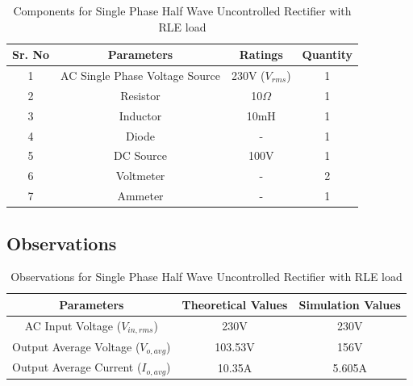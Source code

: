\begin{table}[h]
    \renewcommand{\arraystretch}{1.3}
    \label{table_components_required_single-phase-half-wave-uncontrolled-rectifier-with-RLE-load}
    \centering
    \begin{tabular}{|c|c|c|c|}
        \hline
        Sr. No & Parameters                     & Ratings            & Quantity \\
        \hline
        \hline
        1      & AC Single Phase Voltage Source & 230V ($ V_{rms} $) & 1        \\
        \hline
        2      & Resistor                       & 10$ \Omega $       & 1        \\
        \hline
        3      & Inductor                       & 10mH               & 1        \\
        \hline
        4      & Diode                          & -                  & 1        \\
        \hline
        5      & DC Source                      & 100V               & 1        \\
        \hline
        6      & Voltmeter                      & -                  & 2        \\
        \hline
        7      & Ammeter                        & -                  & 1        \\
        \hline
    \end{tabular}
    \caption{Components for Single Phase Half Wave Uncontrolled Rectifier with RLE load}
\end{table}




\subsection{Observations}

\begin{table}[h]
    \renewcommand{\arraystretch}{1.3}

    \label{table_observation_single-phase-half-wave-uncontrolled-rectifier-with-RLE-load}
    \centering
    \begin{tabular}{|c|c|c|}
        \hline
        Parameters                              & Theoretical Values & Simulation Values \\
        \hline
        \hline
        AC Input Voltage ($ V_{in,rms} $)       & 230V               & 230V              \\
        \hline
        Output Average Voltage ($ V_{o,avg} $)  & 103.53V            & 156V              \\
        \hline
        Output Average Current ($ I_{o,avg}  $) & 10.35A             & 5.605A            \\
        \hline
    \end{tabular}
    \caption{Observations for Single Phase Half Wave Uncontrolled Rectifier with RLE load}
\end{table}


